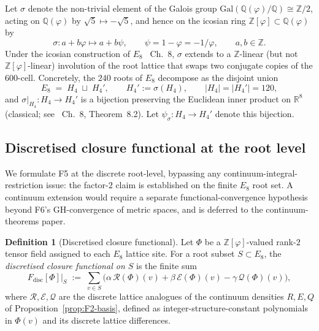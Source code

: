 \documentclass[12pt]{article}
\theoremstyle{definition}
\newtheorem{definition}[theorem]{Definition}
\theoremstyle{remark}
\newcommand{\Zphi}{\mathbb{Z}[\varphi]}
\begin{document}
Let $\sigma$ denote the non-trivial element of the Galois group $\mathrm{Gal}(\mathbb{Q}(\varphi) / \mathbb{Q}) \cong \mathbb{Z}/2$, acting on $\mathbb{Q}(\varphi)$ by $\sqrt{5} \mapsto -\sqrt{5}$, and hence on the icosian ring $\Zphi \subset \mathbb{Q}(\varphi)$ by
\begin{equation}
\sigma : a + b \varphi \longmapsto a + b \psi, \qquad \psi = 1 - \varphi = -1/\varphi, \qquad a, b \in \mathbb{Z}.
\end{equation}
Under the icosian construction of $E_8$~\citep{ConwaySloane1999} Ch.~8, $\sigma$ extends to a $\mathbb{Z}$-linear (but not $\Zphi$-linear) involution of the root lattice that swaps two conjugate copies of the 600-cell. Concretely, the $240$ roots of $E_8$ decompose as the disjoint union
\begin{equation}\label{eq:E8-H4-decomp}
E_8 \;=\; H_4 \;\sqcup\; H_4', \qquad H_4' := \sigma(H_4), \qquad |H_4| = |H_4'| = 120,
\end{equation}
and $\sigma|_{H_4} : H_4 \to H_4'$ is a bijection preserving the Euclidean inner product on $\mathbb{R}^8$ (classical; see~\citep{ConwaySloane1999} Ch.~8, Theorem~8.2). Let $\psi_\sigma : H_4 \to H_4'$ denote this bijection.

\subsection{Discretised closure functional at the root level}\label{sec:F5-discrete}

We formulate F5 at the discrete root-level, bypassing any continuum-integral-restriction issue: the factor-$2$ claim is established on the finite $E_8$ root set. A continuum extension would require a separate functional-convergence hypothesis beyond F6's GH-convergence of metric spaces, and is deferred to the continuum-theorems paper.

\begin{definition}[Discretised closure functional]\label{def:F-discrete}
Let $\Phi$ be a $\Zphi$-valued rank-$2$ tensor field assigned to each $E_8$ lattice site. For a root subset $S \subset E_8$, the \emph{discretised closure functional on $S$} is the finite sum
\begin{equation}\label{eq:F-discrete}
F_{\mathrm{disc}}[\Phi]\bigl|_S \;:=\; \sum_{v \in S} \bigl(\alpha\, \mathcal R(\Phi)(v) + \beta\, \mathcal E(\Phi)(v) - \gamma\, \mathcal Q(\Phi)(v)\bigr),
\end{equation}
where $\mathcal R, \mathcal E, \mathcal Q$ are the discrete lattice analogues of the continuum densities $R, E, Q$ of Proposition~\ref{prop:F2-basis}, defined as integer-structure-constant polynomials in $\Phi(v)$ and its discrete lattice differences.
\end{definition}
\end{document}
